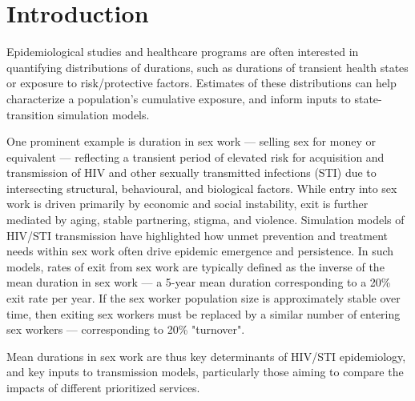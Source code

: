 \section{Introduction}\label{intro}
Epidemiological studies and healthcare programs
are often interested in quantifying distributions of durations,
such as durations of transient health states or exposure to risk/protective factors.
Estimates of these distributions can help
characterize a population's cumulative exposure,\cite{Ben-Shlomo2023} and
inform inputs to state-transition simulation models.\cite{Garnett2011}
\par
One prominent example is duration in sex work
--- selling sex for money or equivalent ---
reflecting a transient period of elevated risk for acquisition and transmission of
HIV and other sexually transmitted infections (STI) due to
intersecting structural, behavioural, and biological factors.
\cite{Scorgie2012,Shannon2015,Baral2015msw}
While entry into sex work is driven primarily by economic and social instability,
exit is further mediated by aging, stable partnering, stigma, and violence.
\cite{Ingabire2012,Bowen2011,Lora2025}
Simulation models of HIV/STI transmission have highlighted how
unmet prevention and treatment needs within sex work
often drive epidemic emergence and persistence.
\cite{Boily2002,Watts2010,Silhol2026}
In such models, rates of exit from sex work are typically defined as
the inverse of the mean duration in sex work
--- \eg a 5-year mean duration corresponding to a 20\% exit rate per year.
If the sex worker population size is approximately stable over time, then
exiting sex workers must be replaced by a similar number of entering sex workers
--- \eg corresponding to 20\% "turnover".\cite{Knight2020}
\par
Mean durations in sex work are thus
key determinants of HIV/STI epidemiology, and key inputs to transmission models,
particularly those aiming to compare the impacts of different prioritized services.

